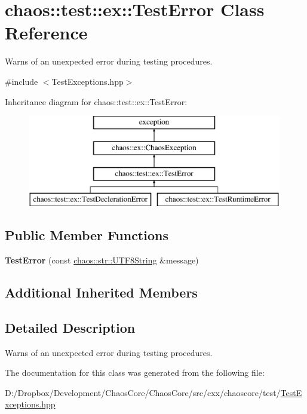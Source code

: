 \hypertarget{classchaos_1_1test_1_1ex_1_1_test_error}{}\section{chaos\+:\+:test\+:\+:ex\+:\+:Test\+Error Class Reference}
\label{classchaos_1_1test_1_1ex_1_1_test_error}


Warns of an unexpected error during testing procedures.  




{\ttfamily \#include $<$Test\+Exceptions.\+hpp$>$}

Inheritance diagram for chaos\+:\+:test\+:\+:ex\+:\+:Test\+Error\+:\begin{figure}[H]
\begin{center}
\leavevmode
\includegraphics[height=4.000000cm]{classchaos_1_1test_1_1ex_1_1_test_error}
\end{center}
\end{figure}
\subsection*{Public Member Functions}
\begin{DoxyCompactItemize}
\item 
\hypertarget{classchaos_1_1test_1_1ex_1_1_test_error_aaea7852b129fc8ed6f6eb182a7d347ad}{}{\bfseries Test\+Error} (const \hyperlink{classchaos_1_1str_1_1_u_t_f8_string}{chaos\+::str\+::\+U\+T\+F8\+String} \&message)\label{classchaos_1_1test_1_1ex_1_1_test_error_aaea7852b129fc8ed6f6eb182a7d347ad}

\end{DoxyCompactItemize}
\subsection*{Additional Inherited Members}


\subsection{Detailed Description}
Warns of an unexpected error during testing procedures. 

The documentation for this class was generated from the following file\+:\begin{DoxyCompactItemize}
\item 
D\+:/\+Dropbox/\+Development/\+Chaos\+Core/\+Chaos\+Core/src/cxx/chaoscore/test/\hyperlink{_test_exceptions_8hpp}{Test\+Exceptions.\+hpp}\end{DoxyCompactItemize}
